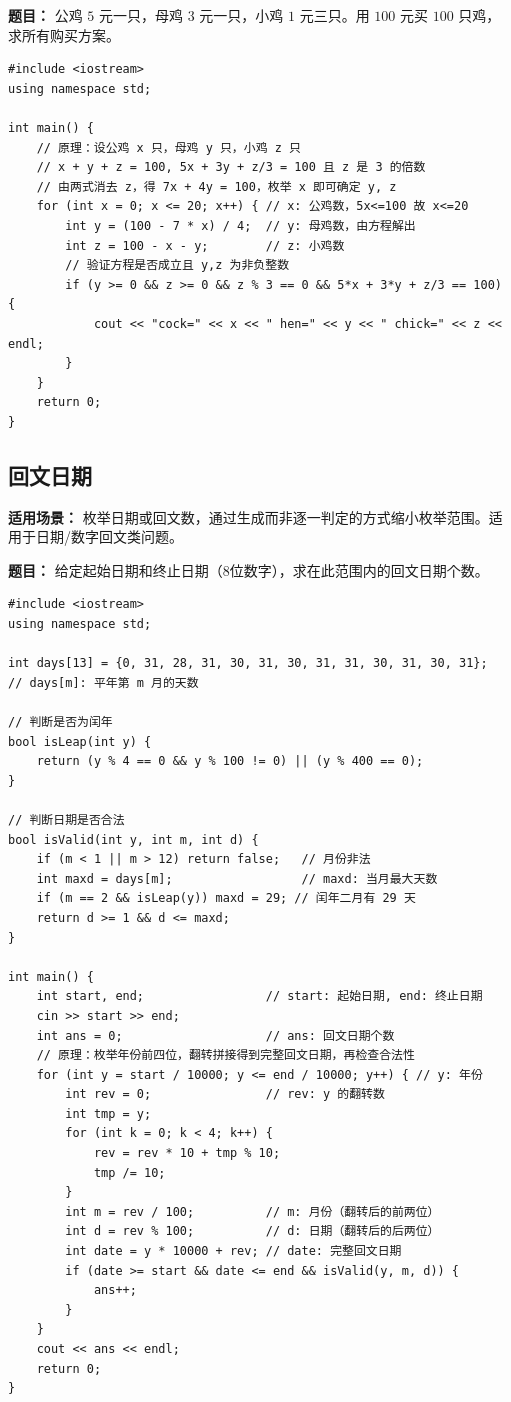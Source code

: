 \documentclass[12pt,a4paper]{ctexart}
\begin{document}
\textbf{题目：} 公鸡 $5$ 元一只，母鸡 $3$ 元一只，小鸡 $1$ 元三只。用 $100$ 元买 $100$ 只鸡，求所有购买方案。

\begin{lstlisting}[caption={百钱百鸡——消元降维枚举}]
#include <iostream>
using namespace std;

int main() {
    // 原理：设公鸡 x 只，母鸡 y 只，小鸡 z 只
    // x + y + z = 100, 5x + 3y + z/3 = 100 且 z 是 3 的倍数
    // 由两式消去 z，得 7x + 4y = 100，枚举 x 即可确定 y, z
    for (int x = 0; x <= 20; x++) { // x: 公鸡数，5x<=100 故 x<=20
        int y = (100 - 7 * x) / 4;  // y: 母鸡数，由方程解出
        int z = 100 - x - y;        // z: 小鸡数
        // 验证方程是否成立且 y,z 为非负整数
        if (y >= 0 && z >= 0 && z % 3 == 0 && 5*x + 3*y + z/3 == 100) {
            cout << "cock=" << x << " hen=" << y << " chick=" << z << endl;
        }
    }
    return 0;
}
\end{lstlisting}

\subsection{回文日期}
\textbf{适用场景：} 枚举日期或回文数，通过生成而非逐一判定的方式缩小枚举范围。适用于日期/数字回文类问题。

\textbf{题目：} 给定起始日期和终止日期（8位数字），求在此范围内的回文日期个数。

\begin{lstlisting}[caption={回文日期——枚举前四位生成回文}]
#include <iostream>
using namespace std;

int days[13] = {0, 31, 28, 31, 30, 31, 30, 31, 31, 30, 31, 30, 31};
// days[m]: 平年第 m 月的天数

// 判断是否为闰年
bool isLeap(int y) {
    return (y % 4 == 0 && y % 100 != 0) || (y % 400 == 0);
}

// 判断日期是否合法
bool isValid(int y, int m, int d) {
    if (m < 1 || m > 12) return false;   // 月份非法
    int maxd = days[m];                  // maxd: 当月最大天数
    if (m == 2 && isLeap(y)) maxd = 29; // 闰年二月有 29 天
    return d >= 1 && d <= maxd;
}

int main() {
    int start, end;                 // start: 起始日期, end: 终止日期
    cin >> start >> end;
    int ans = 0;                    // ans: 回文日期个数
    // 原理：枚举年份前四位，翻转拼接得到完整回文日期，再检查合法性
    for (int y = start / 10000; y <= end / 10000; y++) { // y: 年份
        int rev = 0;                // rev: y 的翻转数
        int tmp = y;
        for (int k = 0; k < 4; k++) {
            rev = rev * 10 + tmp % 10;
            tmp /= 10;
        }
        int m = rev / 100;          // m: 月份（翻转后的前两位）
        int d = rev % 100;          // d: 日期（翻转后的后两位）
        int date = y * 10000 + rev; // date: 完整回文日期
        if (date >= start && date <= end && isValid(y, m, d)) {
            ans++;
        }
    }
    cout << ans << endl;
    return 0;
}
\end{lstlisting}
\end{document}
